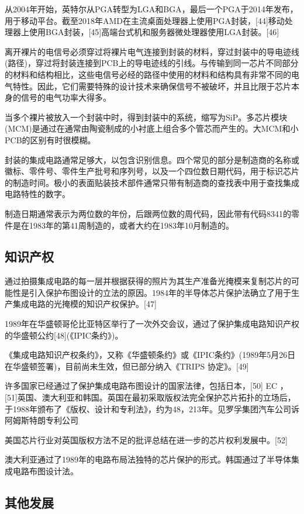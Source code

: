 从2004年开始，英特尔从PGA转型为LGA和BGA，最后一个PGA于2014年发布，用于移动平台。截至2018年AMD在主流桌面处理器上使用PGA封装，[44]移动处理器上使用BGA封装，[45]高端台式机和服务器微处理器使用LGA封装。[46]

离开裸片的电信号必须穿过将裸片电气连接到封装的材料，穿过封装中的导电迹线(路径)，穿过将封装连接到PCB上的导电迹线的引线。与传输到同一芯片不同部分的材料和结构相比，这些电信号必经的路径中使用的材料和结构具有非常不同的电气特性。因此，它们需要特殊的设计技术来确保信号不被破坏，并且比限于芯片本身的信号的电气功率大得多。

当多个裸片被放入一个封装中时，得到封装中的系统，缩写为SiP。多芯片模块(MCM)是通过在通常由陶瓷制成的小衬底上组合多个管芯而产生的。大MCM和小PCB的区别有时很模糊。

封装的集成电路通常足够大，以包含识别信息。四个常见的部分是制造商的名称或徽标、零件号、零件生产批号和序列号，以及一个四位数日期代码，用于标识芯片的制造时间。极小的表面贴装技术部件通常只带有制造商的查找表中用于查找集成电路特性的数字。

制造日期通常表示为两位数的年份，后跟两位数的周代码，因此带有代码8341的零件是在1983年的第41周制造的，或者大约在1983年10月制造的。

\subsection{知识产权}

通过拍摄集成电路的每一层并根据获得的照片为其生产准备光掩模来复制芯片的可能性是引入保护布图设计的立法的原因。1984年的半导体芯片保护法确立了用于生产集成电路的光掩模的知识产权保护。[47]

1989年在华盛顿哥伦比亚特区举行了一次外交会议，通过了保护集成电路知识产权的华盛顿公约[48](《IPIC条约》)。

《集成电路知识产权条约》，又称《华盛顿条约》或《IPIC条约》(1989年5月26日在华盛顿签署)，目前尚未生效，但已部分纳入《TRIPS 协定》。[49]

许多国家已经通过了保护集成电路布图设计的国家法律，包括日本，[50] EC ，[51]英国、澳大利亚和韩国。英国在最初采取版权法完全保护芯片拓扑的立场后，于1988年颁布了《版权、设计和专利法》，约为48，213年。见罗孚集团汽车公司诉阿姆斯特朗专利公司

美国芯片行业对英国版权方法不足的批评总结在进一步的芯片权利发展中。[52]

澳大利亚通过了1989年的电路布局法独特的芯片保护的形式。韩国通过了半导体集成电路布图设计法。

\subsection{其他发展}

